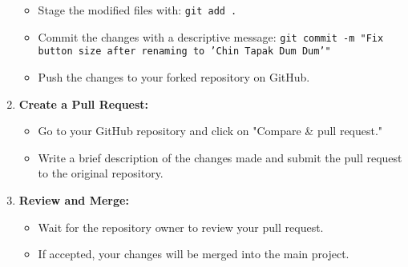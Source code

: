 \documentclass[a4paper,12pt]{article}
\begin{document}
\begin{enumerate}[label=\arabic*.]
    \begin{itemize}
        \item Stage the modified files with: \texttt{git add .}
        \item Commit the changes with a descriptive message: \texttt{git commit -m "Fix button size after renaming to 'Chin Tapak Dum Dum'"}
        \item Push the changes to your forked repository on GitHub.
    \end{itemize}
    \item \textbf{Create a Pull Request:}
    \begin{itemize}
        \item Go to your GitHub repository and click on "Compare & pull request."
        \item Write a brief description of the changes made and submit the pull request to the original repository.
    \end{itemize}
    \item \textbf{Review and Merge:}
    \begin{itemize}
        \item Wait for the repository owner to review your pull request.
        \item If accepted, your changes will be merged into the main project.
    \end{itemize}
\end{enumerate}
\end{document}
